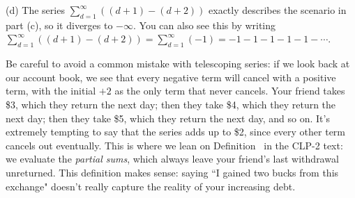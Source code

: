 \begin{solution}
(d) The series $\displaystyle\sum_{d=1}^\infty ((d+1)-(d+2))$ exactly describes the scenario in part (c), so it diverges to $-\infty$. You can also see this by writing
$\displaystyle\sum_{d=1}^\infty ((d+1)-(d+2)) =\sum_{d=1}^\infty (-1)=-1-1-1-1-1-\cdots$.

Be careful to avoid a common mistake with telescoping series: if we look back at our account book, we see that every negative term will cancel with a positive term, with the initial $+2$ as the only term that never cancels. Your friend takes \$3, which they return the next day; then they take \$4, which they return the next day; then they take \$5, which they return the next day, and so on. It's extremely tempting to say that the series adds up to \$2, since every other term cancels out eventually. This is where we lean on Definition~ in the CLP-2 text:
we evaluate the \emph{partial sums}, which always leave your friend's last withdrawal unreturned. This definition makes sense: saying ``I gained two bucks from this exchange" doesn't really capture the reality of your increasing debt.
\end{solution}

